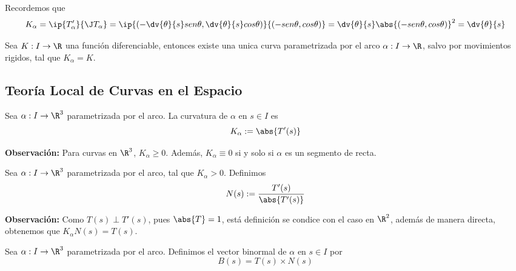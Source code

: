 \documentclass{article}
\begin{document}
\begin{dem}
    Recordemos que
    \begin{equation*}
        K_{\alpha}=\ip{T'_{\alpha}}{\J T_{\alpha}}=
        \ip{\left(-\dv{\theta}{s}sen\theta,\dv{\theta}{s}cos\theta\right)}
        {(-sen\theta,cos\theta)}=\dv{\theta}{s}\abs{(-sen\theta,cos\theta)}^{2}=\dv{\theta}{s}
    \end{equation*}
\end{dem}

\begin{teo}
    Sea $K: I\to\R$ una función diferenciable, entonces existe una unica curva parametrizada por 
    el arco $\alpha: I\to\R$, salvo por movimientos rigidos, tal que $K_{\alpha}=K$.
\end{teo}

\subsection{Teoría Local de Curvas en el Espacio}

\begin{dfn}
    Sea $\alpha: I\to\R^{3}$ parametrizada por el arco. La curvatura de $\alpha$ en $s\in I$ es
    \begin{equation*}
        K_{\alpha}:=\abs{T'(s)}
    \end{equation*}
\end{dfn}

\noindent\textbf{Observación:} Para curvas en $\R^{3}$, $K_{\alpha}\geq0$. Además, 
$K_{\alpha}\equiv0$ si y solo si $\alpha$ es un segmento de recta.

\begin{dfn}
    Sea $\alpha: I\to\R^{3}$ parametrizada por el arco, tal que $K_{\alpha}>0$. Definimos
    \begin{equation*}
        N(s):=\frac{T'(s)}{\abs{T'(s)}}
    \end{equation*}
\end{dfn}

\noindent\textbf{Observación:} Como $T(s)\perp T'(s)$, pues $\abs{T}=1$, está definición se condice
con el caso en $\R^{2}$, además de manera directa, obtenemos que $K_{\alpha}N(s)=T(s)$.

\begin{dfn}
    Sea $\alpha: I\to\R^{3}$ parametrizada por el arco. Definimos el vector binormal de $\alpha$
    en $s\in I$ por
    \begin{equation*}
        B(s)=T(s)\times N(s)
    \end{equation*}
\end{dfn}
\end{document}
